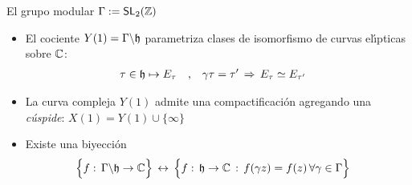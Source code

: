 \begin{frame}{El grupo modular}
	$\Gamma:=\SL[2](\bb Z)$
	\begin{itemize}
		\item El cociente $Y(1)=\Gamma\backslash\hP$ parametriza clases
			de isomorfismo de curvas el\'{\i}pticas sobre $\bb{C}$:
			\begin{align*}
				\tau\in\hP\mapsto E_\tau & \quad\text{,}\quad
				\gamma\tau=\tau'\,\Rightarrow\,
					E_\tau\simeq E_{\tau'}
			\end{align*}
		\item La curva compleja $Y(1)$ admite una compactificaci\'{o}n
			agregando una \emph{c\'{u}spide}:
			$X(1)=Y(1)\cup\{\infty\}$
		\item Existe una biyecci\'{o}n
			\begin{align*}
				\Big\{f:\,\Gamma\backslash\hP\rightarrow\bb{C}
					\Big\} & \,\leftrightarrow\,
				\Big\{f:\,\hP\rightarrow\bb{C}\,:\,
					f(\gamma z)=f(z)\,
					\forall\gamma\in\Gamma\Big\}
			\end{align*}
	\end{itemize}
\end{frame}

